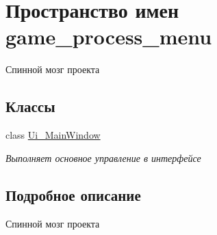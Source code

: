 \hypertarget{namespacegame__process__menu}{}\section{Пространство имен game\+\_\+process\+\_\+menu}
\label{namespacegame__process__menu}


Спинной мозг проекта  


\subsection*{Классы}
\begin{DoxyCompactItemize}
\item 
class \mbox{\hyperlink{classgame__process__menu_1_1_ui___main_window}{Ui\+\_\+\+Main\+Window}}
\begin{DoxyCompactList}\small\item\em Выполняет основное управление в интерфейсе \end{DoxyCompactList}\end{DoxyCompactItemize}


\subsection{Подробное описание}
Спинной мозг проекта 

